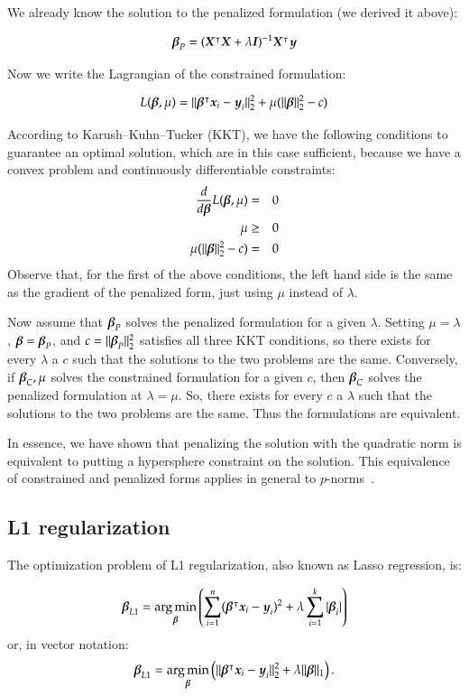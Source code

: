 \begin{refsection}
We already know the solution to the penalized formulation (we derived it above):

$$\boldsymbol{\beta}_{P} = (\boldsymbol{X}^\intercal\boldsymbol{X} + \lambda \boldsymbol{I})^{-1}\boldsymbol{X}^\intercal\boldsymbol{y}$$

Now we write the Lagrangian of the constrained formulation:

$$L(\boldsymbol{\beta}, \mu) =  \lVert \boldsymbol{\beta}^\intercal\boldsymbol{x}_i - \boldsymbol{y}_i \rVert^2_2 + \mu (\lVert \boldsymbol{\beta} \rVert^2_2 - c)$$

According to Karush–Kuhn–Tucker (KKT), we have the following conditions to guarantee an optimal solution, which are in this case sufficient, because we have a convex problem and continuously differentiable constraints:
\begin{eqnarray}
\frac{d}{d\boldsymbol{\beta}} L(\boldsymbol{\beta}, \mu) & = & 0 \\
\mu & \geq & 0 \\
\mu (\lVert \boldsymbol{\beta} \rVert^2_2 - c) & = & 0
\end{eqnarray}
%
Observe that, for the first of the above conditions, the left hand side is the same as the gradient of the penalized form, just using $\mu$ instead of $\lambda$.

Now assume that $\boldsymbol{\beta}_P$ solves the penalized formulation for a given $\lambda$. Setting $\mu = \lambda$, $\boldsymbol{\beta} = \boldsymbol{\beta}_P$, and $c = \lVert \boldsymbol{\beta}_P \rVert^2_2$  satisfies all three KKT conditions, so there exists for every $\lambda$ a $c$ such that the solutions to the two problems are the same. Conversely, if $\boldsymbol{\beta}_C, \mu$ solves the constrained formulation for a given $c$, then $\boldsymbol{\beta}_C$ solves the penalized formulation at $\lambda = \mu$. So, there exists for every $c$ a $\lambda$ such that the solutions to the two problems are the same. Thus the formulations are equivalent.

In essence, we have shown that penalizing the solution with the quadratic norm is equivalent to putting a hypersphere constraint on the solution. This equivalence of constrained and penalized forms applies in general to $p$-norms~\citep{ESL}.

\subsection*{L1 regularization}

The optimization problem of L1 regularization, also known as Lasso regression, is:

$$\boldsymbol{\beta}_{L1} = \operatorname*{arg\,min}_{\boldsymbol{\beta}} \left(\sum_{i=1}^n (\boldsymbol{\beta}^\intercal\boldsymbol{x}_i - \boldsymbol{y}_i)^2 + \lambda \sum_{i=1}^k |\boldsymbol{\beta}_i|\right)$$
%
or, in vector notation: 
%
$$\boldsymbol{\beta}_{L1} = \operatorname*{arg\,min}_{\boldsymbol{\beta}} \left( \lVert \boldsymbol{\beta}^\intercal\boldsymbol{x}_i - \boldsymbol{y}_i \rVert^2_2 + \lambda\lVert \boldsymbol{\beta} \rVert_1\right).$$


\end{refsection}
